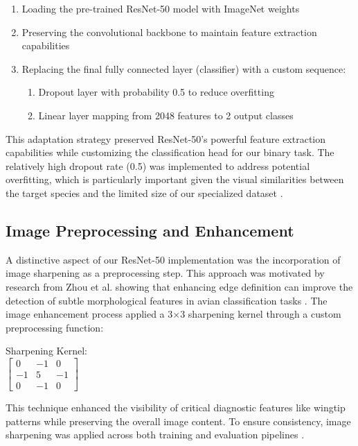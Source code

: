 \begin{enumerate}
    \item Loading the pre-trained ResNet-50 model with ImageNet weights
    \item Preserving the convolutional backbone to maintain feature extraction capabilities
    \item Replacing the final fully connected layer (classifier) with a custom sequence:
    \begin{enumerate}
        \item Dropout layer with probability 0.5 to reduce overfitting
        \item Linear layer mapping from 2048 features to 2 output classes
    \end{enumerate}
\end{enumerate}

This adaptation strategy preserved ResNet-50's powerful feature extraction capabilities while customizing the classification head for our binary task. The relatively high dropout rate (0.5) was implemented to address potential overfitting, which is particularly important given the visual similarities between the target species and the limited size of our specialized dataset \citep{srivastava2014dropout}.

\subsection{Image Preprocessing and Enhancement}

A distinctive aspect of our ResNet-50 implementation was the incorporation of image sharpening as a preprocessing step. This approach was motivated by research from Zhou et al. showing that enhancing edge definition can improve the detection of subtle morphological features in avian classification tasks \citep{zhou2022effective}. The image enhancement process applied a 3$\times$3 sharpening kernel through a custom preprocessing function:

\begin{center}
Sharpening Kernel: \\
$\begin{bmatrix}
0 & -1 & 0 \\
-1 & 5 & -1 \\
0 & -1 & 0
\end{bmatrix}$
\end{center}

This technique enhanced the visibility of critical diagnostic features like wingtip patterns while preserving the overall image content. To ensure consistency, image sharpening was applied across both training and evaluation pipelines \citep{zhao2021image}.

